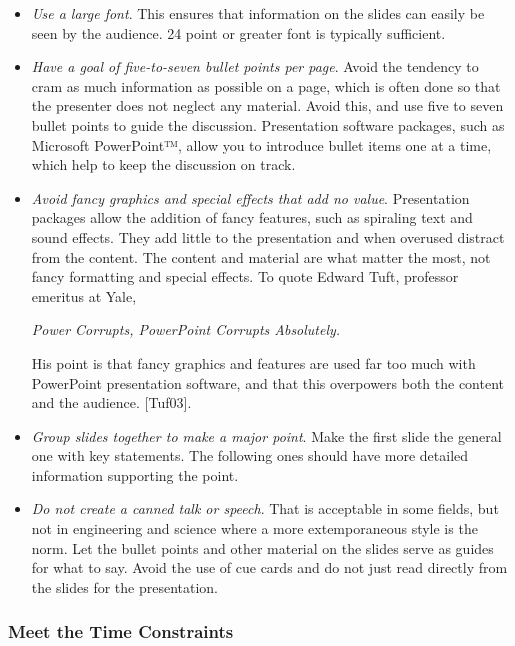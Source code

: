 \begin{itemize}
\item
  \emph{Use a large font}. This ensures that information on the slides
  can easily be seen by the audience. 24 point or greater font is
  typically sufficient.
\item
  \emph{Have a goal of five-to-seven bullet points per page}. Avoid the
  tendency to cram as much information as possible on a page, which is
  often done so that the presenter does not neglect any material. Avoid
  this, and use five to seven bullet points to guide the discussion.
  Presentation software packages, such as Microsoft PowerPoint™, allow
  you to introduce bullet items one at a time, which help to keep the
  discussion on track.
\item
  \emph{Avoid fancy graphics and special effects that add no value}.
  Presentation packages allow the addition of fancy features, such as
  spiraling text and sound effects. They add little to the presentation
  and when overused distract from the content. The content and material
  are what matter the most, not fancy formatting and special effects. To
  quote Edward Tuft, professor emeritus at Yale,

  \emph{Power Corrupts, PowerPoint Corrupts Absolutely.}

  His point is that fancy graphics and features are used far too much
  with PowerPoint presentation software, and that this overpowers both
  the content and the audience. {[}Tuf03{]}.
\item
  \emph{Group slides together to make a major point}. Make the first
  slide the general one with key statements. The following ones should
  have more detailed information supporting the point.
\item
  \emph{Do not create a canned talk or speech}. That is acceptable in
  some fields, but not in engineering and science where a more
  extemporaneous style is the norm. Let the bullet points and other
  material on the slides serve as guides for what to say. Avoid the use
  of cue cards and do not just read directly from the slides for the
  presentation.
\end{itemize}

\subsubsection*{Meet the Time
Constraints}\label{meet-the-time-constraints}

